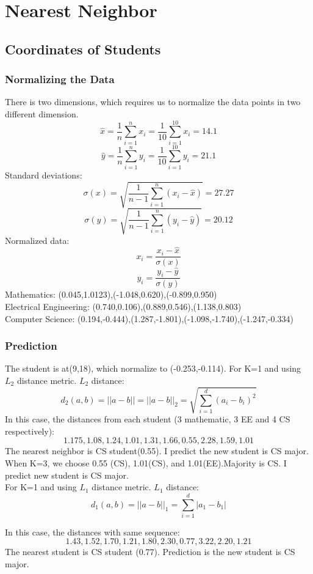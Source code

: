 \documentclass[11pt]{article}
\begin{document}
	\section{Nearest Neighbor}
	\subsection{Coordinates of Students}
	\subsubsection{Normalizing the Data}
	There is two dimensions, which requires us to normalize the data points in two different dimension.
	$$\hat{x} = \frac{1}{n}\sum_{i=1}^{n}x_i = \frac{1}{10}\sum_{i=1}^{10}x_i=14.1$$
	$$\hat{y} = \frac{1}{n}\sum_{i=1}^{n}y_i = \frac{1}{10}\sum_{i=1}^{10}y_i=21.1$$
	Standard deviations:
	$$\sigma(x) = \sqrt{\frac{1}{n-1}\sum_{i=1}^{n}(x_i-\hat{x})}=27.27$$
	$$\sigma(y) = \sqrt{\frac{1}{n-1}\sum_{i=1}^{n}(y_i-\hat{y})}=20.12$$
	Normalized data:
	$$x_i = \frac{x_i-\hat{x}}{\sigma(x)}$$
	$$y_i = \frac{y_i-\hat{y}}{\sigma(y)}$$
	Mathematics: {(0.045,1.0123),(-1.048,0.620),(-0.899,0.950)}\\
	Electrical Engineering: {(0.740,0.106),(0.889,0.546),(1.138,0.803)}\\
	Computer Science: {(0.194,-0.444),(1.287,-1.801),(-1.098,-1.740),(-1.247,-0.334)}	
	\subsubsection{Prediction}
	The student is at(9,18), which normalize to (-0.253,-0.114).
	For K=1 and using $L_2$ distance metric. $L_2$ distance:
	$$d_2(a,b) = ||a-b||=||a-b||_2=\sqrt{\sum_{i=1}^{d}(a_i-b_i)^2}$$
	In this case, the distances from each student (3 mathematic, 3 EE and 4 CS respectively):
	$$1.175,1.08,1.24,1.01,1.31,1.66,0.55,2.28,1.59,1.01$$
	The nearest neighbor is CS student(0.55). I predict the new student is CS major.
	$$  $$
	When K=3, we choose 0.55 (CS), 1.01(CS), and 1.01(EE).Majority is CS. I predict new student is CS major.\\
	
	For K=1 and using $L_1$ distance metric. $L_1$ distance:
	$$d_1(a,b) = ||a-b||_1=\sum_{i=1}^{d}|a_1-b_1|$$
	
	In this case, the distances with same sequence:
	$$1.43,1.52,1.70,1.21,1.80,2.30,0.77,3.22,2.20,1.21$$
	The nearest student is CS student (0.77). Prediction is the new student is CS major.\\
	
\end{document}
